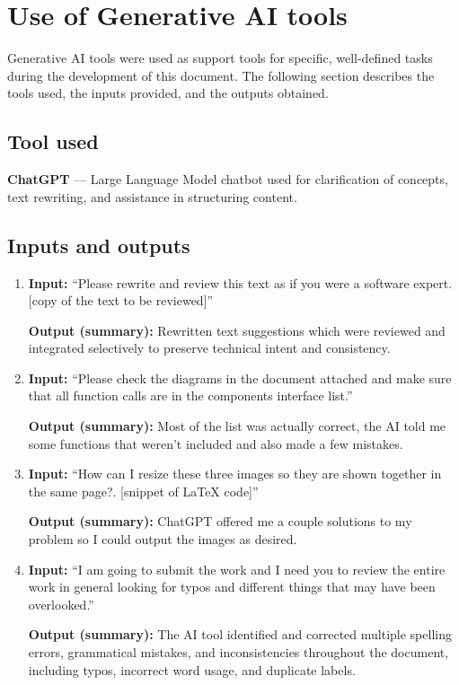 \section{Use of Generative AI tools}
\label{sec:dd_ai_tools}%

Generative AI tools were used as support tools for specific, well-defined tasks during the development of this document. The following section describes the tools used, the inputs provided, and the outputs obtained.

\subsection*{Tool used}
\textbf{ChatGPT} ---  Large Language Model chatbot used for clarification of concepts, text rewriting, and assistance in structuring content.

\subsection*{Inputs and outputs}
\begin{enumerate}
    \item \textbf{Input:} ``Please rewrite and review this text as if you were a software expert. [copy of the text to be reviewed]''
    
    \textbf{Output (summary):} Rewritten text suggestions which were reviewed and integrated selectively to preserve technical intent and consistency.

    \item \textbf{Input:} ``Please check the diagrams in the document attached and make sure that all function calls are in the components interface list.''
    
    \textbf{Output (summary):} Most of the list was actually correct, the AI told me some functions that weren't included and also made a few mistakes.

    \item \textbf{Input:} ``How can I resize these three images so they are shown together in the same page?. [snippet of LaTeX code]''
    
    \textbf{Output (summary):} ChatGPT offered me a couple solutions to my problem so I could output the images as desired.

    \item \textbf{Input:} ``I am going to submit the work and I need you to review the entire work in general looking for typos and different things that may have been overlooked.''
    
    \textbf{Output (summary):} The AI tool identified and corrected multiple spelling errors, grammatical mistakes, and inconsistencies throughout the document, including typos, incorrect word usage, and duplicate labels.
\end{enumerate}

